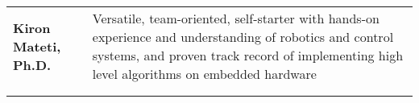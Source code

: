 \begin{tabular}{L{\lcolw} L{\rcolw}}
\textbf{\LARGE {Kiron Mateti, Ph.D.}} & {\large Versatile, team-oriented, self-starter with hands-on experience and understanding of robotics and control systems, and proven track record of implementing high level algorithms on embedded hardware} \\  \\
\hline \hline \\ 
\end{tabular}